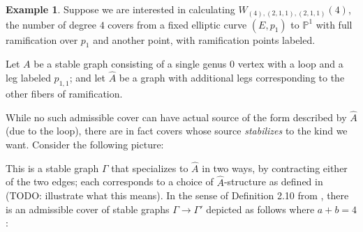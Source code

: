 \documentclass[11pt]{article}           %
\renewcommand{\P}{\mathbb P}
\theoremstyle{definition}
\newtheorem{eg}{Example}[section]
\begin{document}
\begin{eg}
  \label{eg:genusreduction}
  Suppose we are interested in calculating $W_{(4),(2,1,1),(2,1,1)}(4)$, the number of degree $4$ covers from a fixed elliptic curve $(E,p_1)$ to $\P^1$ with full ramification over $p_1$ and another point, with ramification points labeled.
  
  Let $A$ be a stable graph consisting of a single genus $0$ vertex with
  a loop and a leg labeled $p_{1,1}$; and let $\hat A$ be a graph with
  additional legs corresponding to the other fibers of ramification.

  While no such admissible cover
  can have actual source of the form described by $\hat A$ (due to the loop), there are in fact
  covers whose source {\it stabilizes} to the kind we want.
  Consider the following picture:


  This is a stable graph $\Gamma$ that specializes to
  $\hat A$ in two ways, by contracting either of
  the two edges; each corresponds to a choice of $\hat A$-structure
  as defined in \cite{Schmitt} (TODO: illustrate what this means).
  In the sense of Definition 2.10 from \cite{Lian}, there is an admissible cover of stable graphs $\Gamma\to\Gamma'$ depicted as follows where $a+b=4$:


\end{eg}
\end{document}
